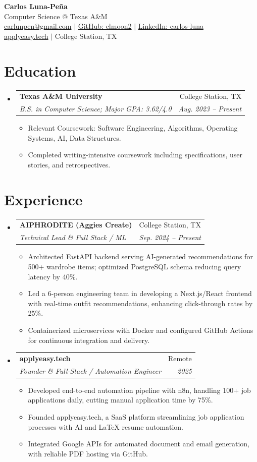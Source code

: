 \documentclass[letterpaper,11pt]{article}
\makeatletter
\newcommand{\resumeItem}[1]{
  \item\small{{#1 \vspace{-2pt}}}
}
\newcommand{\resumeSubheading}[4]{
  \vspace{-2pt}\item
    \begin{tabular*}{0.97\textwidth}[t]{l@{\extracolsep{\fill}}r}
      \textbf{#1} & #2 \\
      \textit{\small#3} & \textit{\small #4} \\
    \end{tabular*}\vspace{-7pt}
}
\newcommand{\resumeSubHeadingListStart}{\begin{itemize}[leftmargin=0.15in, label={}]}
\newcommand{\resumeSubHeadingListEnd}{\end{itemize}}
\newcommand{\resumeItemListStart}{\begin{itemize}}
\newcommand{\resumeItemListEnd}{\end{itemize}\vspace{-5pt}}
\makeatother
\begin{document}
\begin{center}
    \textbf{\LARGE Carlos Luna-Peña}\\
    \small Computer Science @ Texas A\&M\\
    \href{mailto:carlunpen@gmail.com}{carlunpen@gmail.com} $|$ \href{https://github.com/clmoon2}{GitHub: clmoon2} $|$ \href{https://linkedin.com/in/carlos-luna}{LinkedIn: carlos-luna}\\
    \href{https://applyeasy.tech}{applyeasy.tech} $|$ College Station, TX
\end{center}

\section{Education}
\resumeSubHeadingListStart
\resumeSubheading
{Texas A\&M University}{College Station, TX}
{B.S. in Computer Science; Major GPA: 3.62/4.0}{Aug. 2023 -- Present}
\resumeItemListStart
\resumeItem{Relevant Coursework: Software Engineering, Algorithms, Operating Systems, AI, Data Structures.}
\resumeItem{Completed writing-intensive coursework including specifications, user stories, and retrospectives.}
\resumeItemListEnd
\resumeSubHeadingListEnd

\section{Experience}
\resumeSubHeadingListStart

\resumeSubheading
{AIPHRODITE (Aggies Create)}{College Station, TX}
{Technical Lead \& Full Stack / ML}{Sep. 2024 -- Present}
\resumeItemListStart
\resumeItem{Architected FastAPI backend serving AI-generated recommendations for 500+ wardrobe items; optimized PostgreSQL schema reducing query latency by 40\%.}
\resumeItem{Led a 6-person engineering team in developing a Next.js/React frontend with real-time outfit recommendations, enhancing click-through rates by 25\%.}
\resumeItem{Containerized microservices with Docker and configured GitHub Actions for continuous integration and delivery.}
\resumeItemListEnd

\resumeSubheading
{applyeasy.tech}{Remote}
{Founder \& Full-Stack / Automation Engineer}{2025}
\resumeItemListStart
\resumeItem{Developed end-to-end automation pipeline with n8n, handling 100+ job applications daily, cutting manual application time by 75\%.}
\resumeItem{Founded applyeasy.tech, a SaaS platform streamlining job application processes with AI and LaTeX resume automation.}
\resumeItem{Integrated Google APIs for automated document and email generation, with reliable PDF hosting via GitHub.}
\resumeItemListEnd
\resumeSubHeadingListEnd
\end{document}
